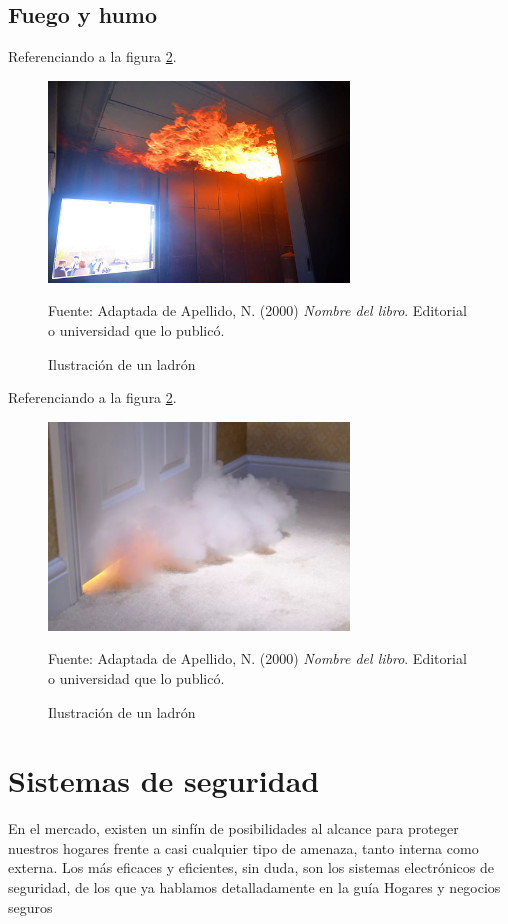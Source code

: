 \subsection{Fuego y humo}
Referenciando a la figura \ref{fig:ejemplo}.
\begin{figure}[H]
    \begin{center}
        \includegraphics[width=8cm]{img/capitulo_3/fuego_en_interiores.jpg}
    \end{center}
    \caption{Ilustración de un ladrón}
    Fuente: Adaptada de Apellido, N. (2000) \textit{Nombre del libro}.
    Editorial o universidad que lo publicó.
    \label{fig:ejemplo}
\end{figure}

Referenciando a la figura \ref{fig:ejemplo}.
\begin{figure}[H]
    \begin{center}
        \includegraphics[width=8cm]{img/capitulo_3/fuego_en_el_cuarto.jpg}
    \end{center}
    \caption{Ilustración de un ladrón}
    Fuente: Adaptada de Apellido, N. (2000) \textit{Nombre del libro}.
    Editorial o universidad que lo publicó.
    \label{fig:ejemplo}
\end{figure}



\section{Sistemas de seguridad}
En el mercado, existen un sinfín de posibilidades al alcance para proteger nuestros hogares frente a casi cualquier tipo de amenaza, tanto interna como externa. Los más eficaces y eficientes, sin duda, son los sistemas electrónicos de seguridad, de los que ya hablamos detalladamente en la guía Hogares y negocios seguros\\

